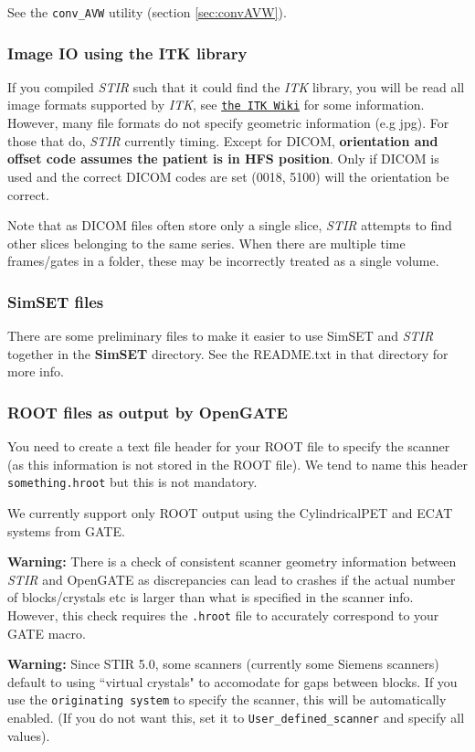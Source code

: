 \documentclass{article}
\def\url#1#2{\mbox{\href{#1}{\tt #2}}}
\begin{document}
See the \texttt{conv\_AVW} utility (section \ref{sec:convAVW}).

\subsubsection{Image IO using the ITK library \label{sec:ITKIO}}
If you compiled \textit{STIR} such that it could find the \textit{ITK} library, you will be read
all image formats supported by \textit{ITK}, see \url{http://www.itk.org/Wiki/ITK/File_Formats}{the ITK Wiki}
for some information. However, many file formats do not specify geometric information (e.g jpg). For those
that do, \textit{STIR} currently timing. Except for DICOM, \textbf{orientation and offset code
assumes the patient is in HFS position}. Only if DICOM is used and the correct DICOM codes are set
(0018, 5100) will the orientation be correct.

Note that as DICOM files often store only a single slice, \textit{STIR} attempts to find
other slices belonging to the same series. When there are multiple time frames/gates in a folder, 
these may be incorrectly treated as a single volume.

\subsubsection{SimSET files}
There are some preliminary files to make it easier to use SimSET and \textit{STIR} together in the
\textbf{SimSET} directory. See the README.txt in that directory for more info.

\subsubsection{ROOT files as output by OpenGATE}
You need to create a text file header for your ROOT file
to specify the scanner (as this information is not stored in the ROOT file).
We tend to name this header \texttt{something.hroot} but this is not mandatory.

We currently support only ROOT output using the CylindricalPET and ECAT systems
from GATE.

\textbf{Warning:} There is a check of consistent scanner geometry information between \textit{STIR}
and OpenGATE as discrepancies can lead to crashes if the actual number of blocks/crystals etc is
larger than what is specified in the scanner info. However, this check requires the \texttt{.hroot}
file to accurately correspond to your GATE macro.

\textbf{Warning:} Since STIR 5.0, some scanners (currently some Siemens scanners) default to using
``virtual crystals" to accomodate for gaps between blocks. If you use
the \texttt{originating system} to specify the scanner, this will be automatically enabled.
(If you do not want this, set it to \texttt{User\_defined\_scanner} and specify all values).
\end{document}
